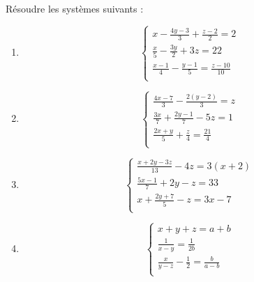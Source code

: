 \begin{exercice}
Résoudre les systèmes suivants : 
\begin{multicols}{2}
\begin{enumerate}
\item $$\left\{ \begin{array}{l}
    x-\frac{4y-3}{3}+\frac{z-2}{2}=2 \\ 
   \frac{x}{5}-\frac{3y}{2}+3z=22 \\ 
   \frac{x-1}{4}-\frac{y-1}{5}=\frac{z-10}{10} \\ 
\end{array} \right.$$

\item $$\left\{ \begin{array}{l}
    \frac{4x-7}{3}-\frac{2(y-2)}{3}=z \\ 
   \frac{3x}{7}+\frac{2y-1}{7}-5z=1 \\ 
   \frac{2x+y}{5}+\frac{z}{4}=\frac{21}{4} \\ 
\end{array} \right.$$
 

\item $$\left\{ \begin{array}{l}
    \frac{x+2y-3z}{13}-4z=3(x+2) \\ 
   \frac{5x-1}{7}+2y-z=33 \\ 
   x+\frac{2y+7}{5}-z=3x-7 \\ 
\end{array} \right.$$

\item $$\left\{ \begin{array}{l}
    x+y+z=a+b \\ 
   \frac{1}{x-y}=\frac{1}{2b} \\ 
   \frac{x}{y-z}-\frac{1}{2}=\frac{b}{a-b} \\ 
\end{array} \right.$$ 
\end{enumerate}
\end{multicols}
\end{exercice}

